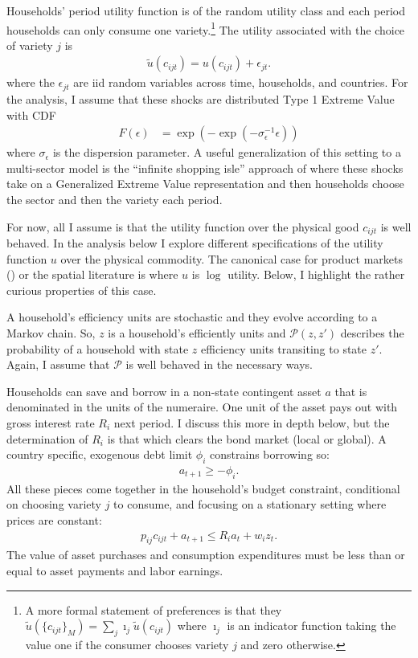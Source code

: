 \documentclass[12pt,pdftex]{article}
\begin{document}
\begin{onehalfspacing}
Households' period utility function is of the random utility class and each period households can only consume one variety.\footnote{A more formal statement of preferences is that they $\tilde{u}( \{ c_{ijt} \}_{M}) = \sum_j \imath_{j} \tilde{u}( c_{ijt})$ where $\imath_{j}$ is an indicator function taking the value one if the consumer chooses variety $j$ and zero otherwise.} The utility associated with the choice of variety $j$ is
\begin{align}
\tilde{u}( c_{ijt} ) =  u(c_{ijt}) + \epsilon_{jt}. \label{eq:utility}
\end{align}
where the $\epsilon_{jt}$ are iid random variables across time, households, and countries. For the analysis, I assume that these shocks are distributed Type 1 Extreme Value with CDF
\begin{align}
F(\epsilon) &= \exp(-\exp(-\sigma_{\epsilon}^{-1}\epsilon))
\end{align}
where $\sigma_{\epsilon}$ is the dispersion parameter. A useful generalization of this setting to a multi-sector model is the ``infinite shopping isle'' approach of \citet{p-iq} where these shocks take on a Generalized Extreme Value representation and then households choose the sector and then the variety each period.

For now, all I assume is that the utility function over the physical good $c_{ijt}$ is well behaved. In the analysis below I explore different specifications of the utility function $u$ over the physical commodity. The canonical case for product markets (\citet{anderson1987ces}) or the spatial literature is where $u$ is $\log$ utility. Below, I highlight the rather curious properties of this case.

A household's efficiency units are stochastic and they evolve according to a Markov chain. So, $z$ is a household's efficiently units and $\mathcal{P}(z,z')$ describes the probability of a household with state $z$ efficiency units transiting to state $z'$. Again, I assume that $\mathcal{P}$ is well behaved in the necessary ways.

Households can save and borrow in a non-state contingent asset $a$ that is denominated in the units of the numeraire. One unit of the asset pays out with gross interest rate $R_i$ next period. I discuss this more in depth below, but the determination of $R_{i}$ is that which clears the bond market (local or global). A country specific, exogenous debt limit $\phi_{i}$ constrains borrowing so:
\begin{align}
a_{t+1} \geq - \phi_{i}.
\label{eq:borrowing-constraint}
\end{align}
All these pieces come together in the household's budget constraint, conditional on choosing variety $j$ to consume, and focusing on a stationary setting where prices are constant:
\begin{align}
p_{ij}c_{ijt} +  a_{t+1} \leq    R_{i} a_{t} + w_{i} z_{t}.\label{eq:trade-budget-constraint}
\end{align}
The value of asset purchases and consumption expenditures must be less than or equal to asset payments and labor earnings.


\end{onehalfspacing}
\end{document}
